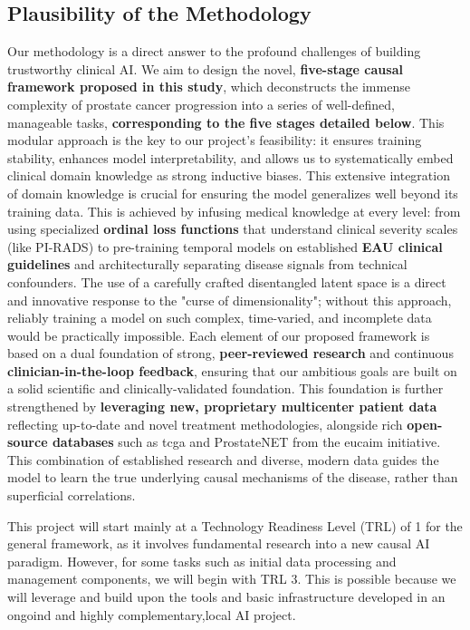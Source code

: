 \documentclass[11pt, a4paper]{article}
\begin{document}
\subsection{Plausibility of the Methodology}
Our methodology is a direct answer to the profound challenges of building trustworthy clinical AI. We aim to design the novel, \textbf{five-stage causal framework proposed in this study}, which deconstructs the immense complexity of prostate cancer progression into a series of well-defined, manageable tasks, \textbf{corresponding to the five stages detailed below}. This modular approach is the key to our project's feasibility: it ensures training stability, enhances model interpretability, and allows us to systematically embed clinical domain knowledge as strong inductive biases. This extensive integration of domain knowledge is crucial for ensuring the model generalizes well beyond its training data. This is achieved by infusing medical knowledge at every level: from using specialized \textbf{ordinal loss functions} that understand clinical severity scales (like PI-RADS) to pre-training temporal models on established \textbf{EAU clinical guidelines} and architecturally separating disease signals from technical confounders. The use of a carefully crafted disentangled latent space is a direct and innovative response to the "curse of dimensionality"; without this approach, reliably training a model on such complex, time-varied, and incomplete data would be practically impossible. Each element of our proposed framework is based on a dual foundation of strong, \textbf{peer-reviewed research} and continuous \textbf{clinician-in-the-loop feedback}, ensuring that our ambitious goals are built on a solid scientific and clinically-validated foundation. This foundation is further strengthened by \textbf{leveraging new, proprietary multicenter patient data} reflecting up-to-date and novel treatment methodologies, alongside rich \textbf{open-source databases} such as \gls{tcga} and ProstateNET from the \gls{eucaim} initiative. This combination of established research and diverse, modern data guides the model to learn the true underlying causal mechanisms of the disease, rather than superficial correlations.



This project will start mainly at a Technology Readiness Level (TRL) of 1 for the general framework, as it involves fundamental research into a new causal AI paradigm. However, for some tasks such as initial data processing and management components, we will begin with TRL 3. This is possible because we will leverage and build upon the tools and basic infrastructure developed in an ongoind and highly complementary,local AI project.
\end{document}
